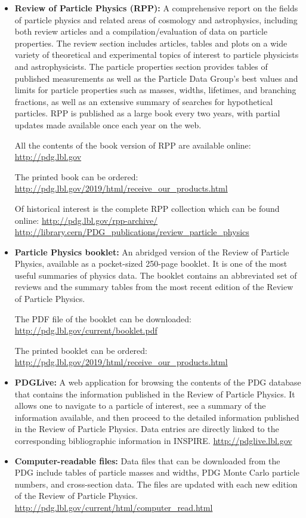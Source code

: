 \begin{itemize}
\item
  \textbf{Review of Particle Physics (RPP):} A comprehensive report on
  the fields of particle physics and related areas of cosmology and
  astrophysics, including both review articles and a
  compilation/evaluation of data on particle properties. The review
  section includes articles, tables and plots on a wide variety of
  theoretical and experimental topics of interest to particle physicists
  and astrophysicists. The particle properties section provides tables
  of published measurements as well as the Particle Data Group's best
  values and limits for particle properties such as masses, widths,
  lifetimes, and branching fractions, as well as an extensive summary of
  searches for hypothetical particles. RPP is published as a large book
  every two years, with partial updates made available once each year on
  the web.

  All the contents of the book version of RPP are available online:
  \url{http://pdg.lbl.gov}

  The printed book can be ordered:
  \url{http://pdg.lbl.gov/2019/html/receive_our_products.html}

  Of historical interest is the complete RPP collection which can be
  found online: \url{http://pdg.lbl.gov/rpp-archive/}
  \url{http://library.cern/PDG_publications/review_particle_physics}
\item
  \textbf{Particle Physics booklet:} An abridged version of the Review
  of Particle Physics, available as a pocket-sized 250-page booklet. It
  is one of the most useful summaries of physics data. The booklet
  contains an abbreviated set of reviews and the summary tables from the
  most recent edition of the Review of Particle Physics.

  The PDF file of the booklet can be downloaded:
  \url{http://pdg.lbl.gov/current/booklet.pdf}

  The printed booklet can be ordered:
  \url{http://pdg.lbl.gov/2019/html/receive_our_products.html}
\item
  \textbf{PDGLive:} A web application for browsing the contents of the
  PDG database that contains the information published in the Review of
  Particle Physics. It allows one to navigate to a particle of interest,
  see a summary of the information available, and then proceed to the
  detailed information published in the Review of Particle Physics. Data
  entries are directly linked to the corresponding bibliographic
  information in INSPIRE. \url{http://pdglive.lbl.gov}
\item
  \textbf{Computer-readable files:} Data files that can be downloaded
  from the PDG include tables of particle masses and widths, PDG Monte
  Carlo particle numbers, and cross-section data. The files are updated
  with each new edition of the Review of Particle Physics.
  \url{http://pdg.lbl.gov/current/html/computer_read.html}
\end{itemize}

